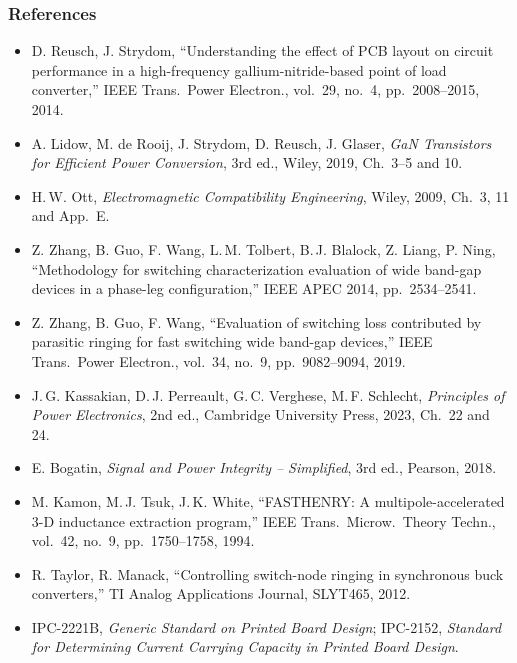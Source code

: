 \begin{frame}
	\frametitle{References}
	\scriptsize
	\begin{itemize}
		\item D. Reusch, J. Strydom, ``Understanding the effect of PCB layout on circuit performance in a high-frequency gallium-nitride-based point of load converter,'' IEEE Trans.\ Power Electron., vol.\ 29, no.\ 4, pp.\ 2008--2015, 2014.
		\item A. Lidow, M. de Rooij, J. Strydom, D. Reusch, J. Glaser, \textit{GaN Transistors for Efficient Power Conversion}, 3rd ed., Wiley, 2019, Ch.\ 3--5 and 10.
		\item H.\,W. Ott, \textit{Electromagnetic Compatibility Engineering}, Wiley, 2009, Ch.\ 3, 11 and App.\ E.
		\item Z. Zhang, B. Guo, F. Wang, L.\,M. Tolbert, B.\,J. Blalock, Z. Liang, P. Ning, ``Methodology for switching characterization evaluation of wide band-gap devices in a phase-leg configuration,'' IEEE APEC 2014, pp.\ 2534--2541.
		\item Z. Zhang, B. Guo, F. Wang, ``Evaluation of switching loss contributed by parasitic ringing for fast switching wide band-gap devices,'' IEEE Trans.\ Power Electron., vol.\ 34, no.\ 9, pp.\ 9082--9094, 2019.
		\item J.\,G. Kassakian, D.\,J. Perreault, G.\,C. Verghese, M.\,F. Schlecht, \textit{Principles of Power Electronics}, 2nd ed., Cambridge University Press, 2023, Ch.\ 22 and 24.
		\item E. Bogatin, \textit{Signal and Power Integrity -- Simplified}, 3rd ed., Pearson, 2018.
		\item M. Kamon, M.\,J. Tsuk, J.\,K. White, ``FASTHENRY: A multipole-accelerated 3-D inductance extraction program,'' IEEE Trans.\ Microw.\ Theory Techn., vol.\ 42, no.\ 9, pp.\ 1750--1758, 1994.
		\item R. Taylor, R. Manack, ``Controlling switch-node ringing in synchronous buck converters,'' TI Analog Applications Journal, SLYT465, 2012.
		\item IPC-2221B, \textit{Generic Standard on Printed Board Design}; IPC-2152, \textit{Standard for Determining Current Carrying Capacity in Printed Board Design}.
	\end{itemize}
\end{frame}
